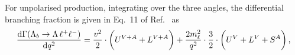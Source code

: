 For unpolarised \Lb production,
%
%
integrating over the three angles, the differential branching fraction is given in Eq.~11 of Ref.~\cite{Gutsche:2013pp} as
\begin{eqnarray}
\label{bjoint00}
\frac{\mathrm{d}\Gamma(\Lambda_b \rightarrow \Lambda \,\ell^{+}\ell^{-})}{\mathrm{d} q^2}=
\frac{v^{2}}{2}\cdot\bigg( U^{V+A} + L^{V+A} \bigg)
+\frac{2m_\ell^{2}}{q^{2}}\cdot\frac{3}{2}\cdot
\bigg( U^{V} + L^{V} + S^{A} \bigg)\,, 
\end{eqnarray}
